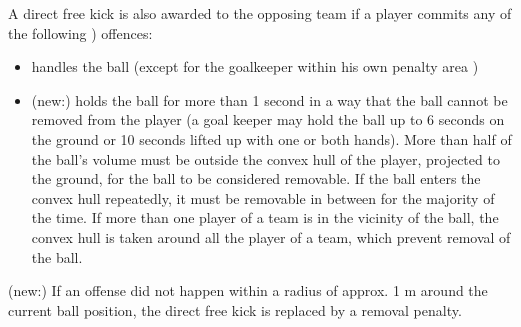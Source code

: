 
\bigskip


A direct free kick is also awarded to the opposing team if a player commits any of the following  ) offences: 

\begin{itemize}
\item handles the ball (except for the goalkeeper within his own penalty area )
\item (new:) holds the ball for more than 1 second in a way that the ball cannot be removed from the player (a goal keeper may hold the ball up to 6 seconds on the ground or 10 seconds lifted up with one or both hands). More than half of the ball's volume must be outside the convex hull of the player, projected to the ground, for the ball to be considered removable. If the ball enters the convex hull repeatedly, it must be removable in between for the majority of the time. If more than one player of a team is in the vicinity of the ball, the convex hull is taken around all the player of a team, which prevent removal of the ball.
\end{itemize}

\bigskip

(new:) If an offense did not happen within a radius of approx. 1 m around the current ball position, the direct free kick is replaced by a removal penalty.

